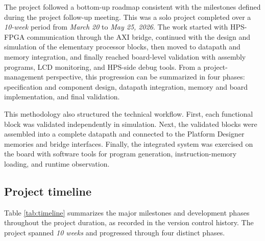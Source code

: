 \documentclass[a4paper,11pt]{scrartcl}
\begin{document}
The project followed a bottom-up roadmap consistent with the milestones defined during the project follow-up meeting. This was a solo project completed over a \emph{10-week} period from \emph{March 20} to \emph{May 25, 2026}. The work started with HPS-FPGA communication through the AXI bridge, continued with the design and simulation of the elementary processor blocks, then moved to datapath and memory integration, and finally reached board-level validation with assembly programs, LCD monitoring, and HPS-side debug tools. From a project-management perspective, this progression can be summarized in four phases: specification and component design, datapath integration, memory and board implementation, and final validation.

This methodology also structured the technical workflow. First, each functional block was validated independently in simulation. Next, the validated blocks were assembled into a complete datapath and connected to the Platform Designer memories and bridge interfaces. Finally, the integrated system was exercised on the board with software tools for program generation, instruction-memory loading, and runtime observation.
\subsection{Project timeline}
\label{sec:org9d9a5bc}

Table \ref{tab:timeline} summarizes the major milestones and development phases throughout the project duration, as recorded in the version control history. The project spanned \emph{10 weeks} and progressed through four distinct phases.
\end{document}
